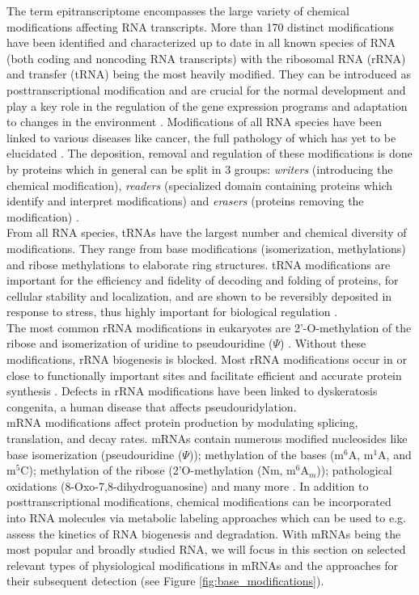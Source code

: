 The term epitranscriptome encompasses the large variety of chemical modifications affecting RNA transcripts. More than 170 distinct modifications have been identified and characterized up to date \citep{Boccaletto2018} in all known species of RNA (both coding and noncoding RNA transcripts) with the ribosomal RNA (rRNA) and transfer (tRNA) being the most heavily modified. They can be introduced as posttranscriptional modification and are crucial for the normal development and play a key role in the regulation of the gene expression programs and adaptation to changes in the environment \citep{Frye2018,Roundtree2017}.  Modifications of all RNA species have been linked to various diseases like cancer, the full pathology of which has yet to be elucidated \citep{Barbieri2020}.  The deposition, removal and regulation of these modifications is done by proteins which in general can be split in 3 groups: \textit{writers} (introducing the chemical modification), \textit{readers} (specialized domain containing proteins which identify and interpret modifications) and \textit{erasers} (proteins removing the modification) \citep{Nie2020}. \\
From all RNA species, tRNAs have the largest number and chemical diversity of modifications. They range from base modifications (isomerization, methylations) and ribose methylations to elaborate ring structures. tRNA modifications are important for the efficiency and fidelity of decoding and folding of proteins, for cellular stability and localization, and are shown to be reversibly deposited in response to stress, thus highly important for  biological regulation \citep{Pan2018}. \\
The most common rRNA modifications in eukaryotes are 2'-O-methylation of the ribose and isomerization of uridine to pseudouridine ($\Psi$) \citep{Sloan2017}. Without these modifications, rRNA biogenesis is blocked. Most rRNA modifications occur in or close to functionally important sites and facilitate efficient and accurate protein synthesis \citep{Delaunay2019}. Defects in rRNA modifications have been linked to dyskeratosis congenita, a human disease that affects pseudouridylation. \\
mRNA modifications affect protein production by modulating splicing, translation, and decay rates. mRNAs contain numerous modified nucleosides like base isomerization (pseudouridine ($\Psi$)); methylation of the bases (m$^6$A, m$^1$A, and m$^5$C); methylation of the ribose (2'O-methylation (Nm, m$^6$A$_m$)); pathological oxidations (8-Oxo-7,8-dihydroguanosine) and many more \citep{Roundtree2017,Boo2020}. In addition to posttranscriptional modifications, chemical modifications can be incorporated into RNA molecules via metabolic labeling approaches which can be used to e.g. assess the kinetics of RNA biogenesis and degradation. With mRNAs being the most popular and broadly studied RNA, we will focus in this section on selected relevant types of physiological modifications in mRNAs and the approaches for their subsequent detection (see Figure \ref{fig:base_modifications}).
 
